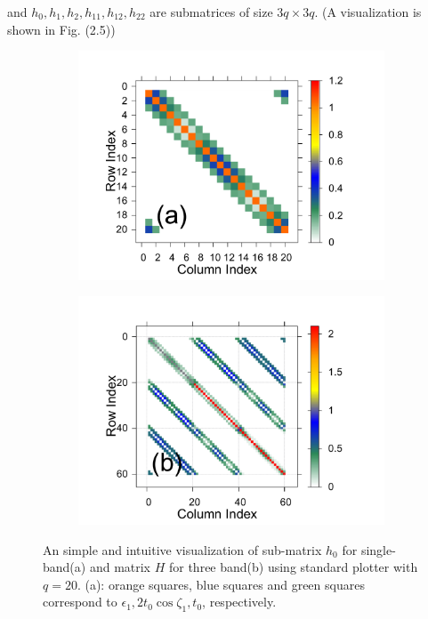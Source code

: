 \documentclass{report}
\begin{document}
and $h_{0},h_{1},h_{2},h_{11},h_{12},h_{22}$ are submatrices of size $3q \times 3q$. (A visualization is shown in Fig. (2.5))
\begin{figure}[htb]
	\centering
	\begin{subfigure}[b]{0.495\textwidth}
		\centering
		\includegraphics[width=0.9\linewidth]{pic/matrix_1band_h0_q_20.pdf}
		\label{fig:3 band matrix}
	\end{subfigure}
	\begin{subfigure}[b]{0.495\textwidth}
		\centering
		\includegraphics[width=0.9\linewidth]{pic/matrix_3band_h0_q_20.pdf}
		\label{fig:1 band matrix}
	\end{subfigure}
	\caption[A visualization of super matrix.]{
		An simple and intuitive visualization of sub-matrix $h_{0}$ for single-band(a) and matrix $H$ for three band(b) using standard plotter with $q = 20$. (a): orange squares, blue squares and green squares correspond to $\epsilon_{1}, 2 t_{0} \cos \zeta_{1}, t_{0}$, respectively.
	}
\end{figure}
\end{document}
